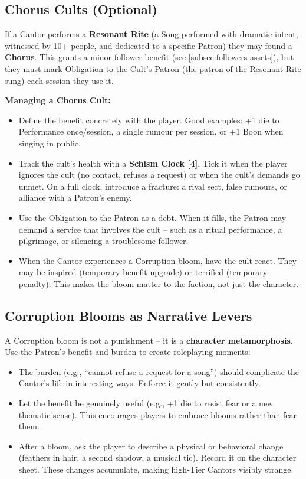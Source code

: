 \subsection*{Chorus Cults (Optional)}
\label{subsec:chorus-cults-gm}
If a Cantor performs a \textbf{Resonant Rite} (a Song performed with dramatic intent, witnessed by 10+ people, and dedicated to a specific Patron) they may found a \textbf{Chorus}. This grants a minor follower benefit (see \ref{subsec:followers-assets}), but they must mark Obligation to the Cult's Patron (the patron of the Resonant Rite sung) each session they use it.

\textbf{Managing a Chorus Cult:}
\begin{itemize}
  \item Define the benefit concretely with the player. Good examples: +1 die to Performance once/session, a single rumour per session, or +1 Boon when singing in public.
  \item Track the cult’s health with a \textbf{Schism Clock [4]}. Tick it when the player ignores the cult (no contact, refuses a request) or when the cult’s demands go unmet. On a full clock, introduce a fracture: a rival sect, false rumours, or alliance with a Patron’s enemy.
  \item Use the Obligation to the Patron as a debt. When it fills, the Patron may demand a service that involves the cult – such as a ritual performance, a pilgrimage, or silencing a troublesome follower.
  \item When the Cantor experiences a Corruption bloom, have the cult react. They may be inspired (temporary benefit upgrade) or terrified (temporary penalty). This makes the bloom matter to the faction, not just the character.
\end{itemize}

\subsection*{Corruption Blooms as Narrative Levers}
\label{subsec:corruption-blooms}
A Corruption bloom is not a punishment – it is a \textbf{character metamorphosis}. Use the Patron’s benefit and burden to create roleplaying moments:
\begin{itemize}
  \item The burden (e.g., “cannot refuse a request for a song”) should complicate the Cantor’s life in interesting ways. Enforce it gently but consistently.
  \item Let the benefit be genuinely useful (e.g., +1 die to resist fear or a new thematic sense). This encourages players to embrace blooms rather than fear them.
  \item After a bloom, ask the player to describe a physical or behavioral change (feathers in hair, a second shadow, a musical tic). Record it on the character sheet. These changes accumulate, making high‑Tier Cantors visibly strange.
\end{itemize}

